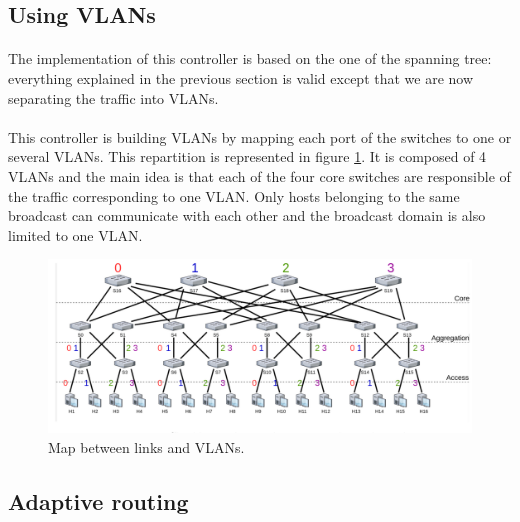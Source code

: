\documentclass[a4paper, 11pt, oneside]{article}
\begin{document}
\subsection{Using VLANs}
\paragraph{}The implementation of this controller is based on the one of the spanning tree: everything explained in the previous section is valid except that we are now separating the traffic into VLANs.
\paragraph{}This controller is building VLANs by mapping each port of the switches to one or several VLANs. This repartition is represented in figure \ref{VLANs_rep}. It is composed of 4 VLANs and the main idea is that each of the four core switches are responsible of the traffic corresponding to one VLAN. 
Only hosts belonging to the same broadcast can communicate with each other and the broadcast domain is also limited to one VLAN.

\begin{figure}[H]
    \center
    \includegraphics[scale = 0.4]{VLANs/VLANs.png}
    \caption{Map between links and VLANs.}
    \label{VLANs_rep}
    \end{figure}
\subsection{Adaptive routing} \label{subsec:adaptive}
\end{document}
